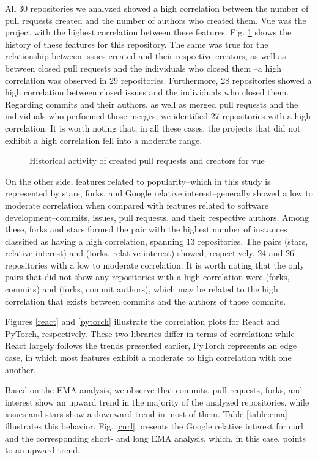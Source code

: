 \documentclass[10pt,conference,peerreview]{IEEEtran}
\begin{document}
All 30 repositories we analyzed showed a high correlation between the number of pull requests created and the number of authors who created them. Vue was the project with the highest correlation between these features. Fig. \ref{vue} shows the history of these features for this repository. The same was true for the relationship between issues created and their respective creators, as well as between closed pull requests and the individuals who closed them --a high correlation was observed in 29 repositories. Furthermore, 28 repositories showed a high correlation between closed issues and the individuals who closed them. Regarding commits and their authors, as well as merged pull requests and the individuals who performed those merges, we identified 27 repositories with a high correlation. It is worth noting that, in all these cases, the projects that did not exhibit a high correlation fell into a moderate range.

\begin{figure}[htbp]
    \centering
    
    \caption{Historical activity of created pull requests and creators for vue}
    \label{vue}
\end{figure}

On the other side, features related to popularity--which in this study is represented by stars, forks, and Google relative interest--generally showed a low to moderate correlation when compared with features related to software development--commits, issues, pull requests, and their respective authors. Among these, forks and stars formed the pair with the highest number of instances classified as having a high correlation, spanning 13 repositories. The pairs (stars, relative interest) and (forks, relative interest) showed, respectively, 24 and 26 repositories with a low to moderate correlation. It is worth noting that the only pairs that did not show any repositories with a high correlation were (forks, commits) and (forks, commit authors), which may be related to the high correlation that exists between commits and the authors of those commits.

Figures \ref{react} and \ref{pytorch} illustrate the correlation plots for React and PyTorch, respectively. These two libraries differ in terms of correlation: while React largely follows the trends presented earlier, PyTorch represents an edge case, in which most features exhibit a moderate to high correlation with one another.

Based on the EMA analysis, we observe that commits, pull requests, forks, and interest show an upward trend in the majority of the analyzed repositories, while issues and stars show a downward trend in most of them. Table \ref{table:ema} illustrates this behavior. Fig. \ref{curl} presents the Google relative interest for curl and the corresponding short- and long EMA analysis, which, in this case, points to an upward trend.
\end{document}

